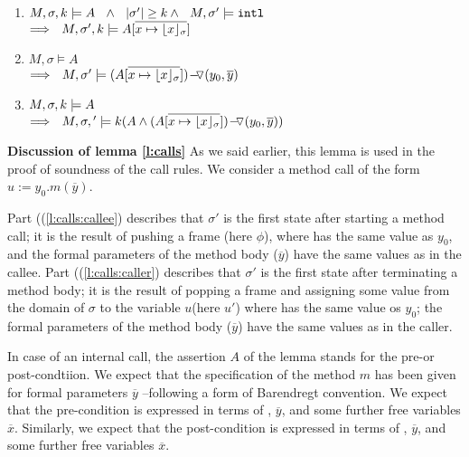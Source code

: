\begin{lemma}
\begin{enumerate}
\begin{enumerate}
\item
\label{l:calls:caller:one}
$\satDAssertFrom M  \sigma k   A \ \ \wedge\ \ \DepthSt {\sigma'} \geq k  \wedge\ \ M, \sigma' \models \intThis $ \\
$\Longrightarrow\ \  \satDAssertFrom M  {\sigma'} k   {A[\overline {x \mapsto {\interpret \sigma x}}]}$ 

\item
\label{l:calls:caller:two}
$  M , \sigma \models   A$   \\
$\Longrightarrow\ \  M , \sigma' \models  {\PushASLong  {(y_0,\overline y)}   {(A[\overline {x \mapsto {\interpret \sigma x}}])}}$

\item
\label{l:calls:caller:three}
$\satDAssertFrom M  \sigma k   A $   \\
$\Longrightarrow\ \  \satDAssertFrom M  \sigma' k    {(A \wedge \PushASLong  {(y_0,\overline y)}   {(A[\overline {x \mapsto {\interpret \sigma x}}])})}$

 \end{enumerate}
\end{enumerate}

\end{lemma}

\textbf{Discussion of lemma  \ref{l:calls}}
As we said earlier, this lemma is used in the proof of soundness of the call rules. 
We consider a method call of the form $u:= y_0.m(\overline y)$.

Part ((\ref{l:calls:callee}) describes that $\sigma'$ is the first state after starting a method call; it is
the result of pushing a frame (here $\phi$), where  has the same value as $y_0$, 
and the formal parameters of the method body ($\overline y$) have the same values as in the callee.
Part ((\ref{l:calls:caller}) describes that $\sigma'$ is the first state after terminating a method body; it is
the result of popping a frame  and assigning  some value from the domain of $\sigma$ to the variable $u$(here $u'$) where  has the same value os $y_0$; the formal parameters of the method body ($\overline y$) have the same values as in the caller.

In case of an internal call, the assertion $A$ of the lemma stands for the pre-or post-condtiion.
We  expect that the specification of the method $m$ has been
given for formal parameters $\overline y$ --following a form of Barendregt convention.
We  expect that  the pre-condition 
is expressed in terms of , $\overline y$, and some further free variables $\overline x$.
Similarly, we   expect that  the post-condition 
is expressed in terms of , $\overline y$, and some further free variables $\overline x$.

